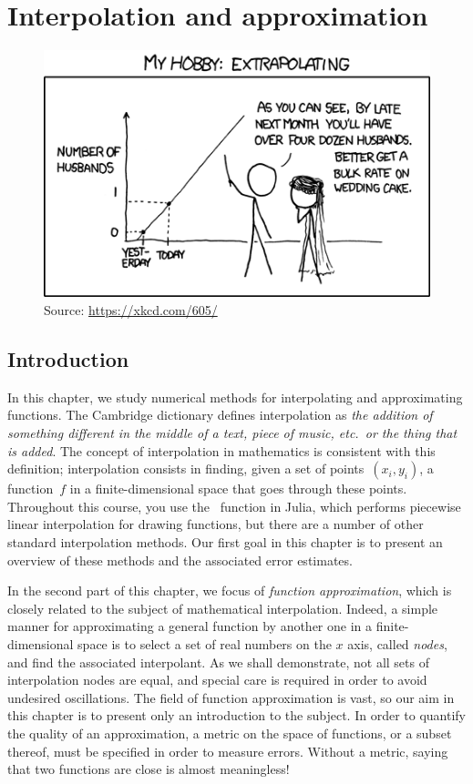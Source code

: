 \chapter{Interpolation and approximation}%
\label{cha:interpolation_and_approximation}

\minitoc

\begin{figure}[ht]
    \centering
    \includegraphics[width=0.5\linewidth]{figures/extrapolating.png}
    \caption{Source: \url{https://xkcd.com/605/}}
\end{figure}

\section*{Introduction}
In this chapter,
we study numerical methods for interpolating and approximating functions.
The Cambridge dictionary defines interpolation as \emph{the addition of something different in the middle of a text, piece of music, etc.~or the thing that is added}.
The concept of interpolation in mathematics is consistent with this definition;
interpolation consists in finding, given a set of points~$(x_i, y_i)$,
a function~$f$ in a finite-dimensional space that goes through these points.
Throughout this course, you use the~ function in Julia,
which performs piecewise linear interpolation for drawing functions,
but there are a number of other standard interpolation methods.
Our first goal in this chapter is to present an overview of these methods and the associated error estimates.

In the second part of this chapter,
we focus of \emph{function approximation},
which is closely related to the subject of mathematical interpolation.
Indeed, a simple manner for approximating a general function by another one in a finite-dimensional space is to select a set of real numbers on the $x$ axis,
called \emph{nodes}, and find the associated interpolant.
As we shall demonstrate, not all sets of interpolation nodes are equal,
and special care is required in order to avoid undesired oscillations.
The field of function approximation is vast,
so our aim in this chapter is to present only an introduction to the subject.
In order to quantify the quality of an approximation,
a metric on the space of functions,
or a subset thereof, must be specified in order to measure errors.
Without a metric, saying that two functions are close is almost meaningless!


